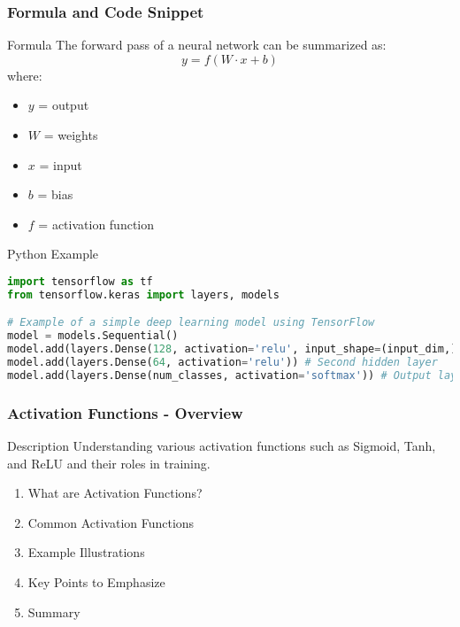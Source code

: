 \documentclass[aspectratio=169]{beamer}
\begin{document}
\begin{frame}[fragile]
    \frametitle{Formula and Code Snippet}
    \begin{block}{Formula}
        The forward pass of a neural network can be summarized as:
        \begin{equation}
            y = f(W \cdot x + b)
        \end{equation}
        where:
        \begin{itemize}
            \item \( y \) = output
            \item \( W \) = weights
            \item \( x \) = input
            \item \( b \) = bias
            \item \( f \) = activation function
        \end{itemize}
    \end{block}
    
    \begin{block}{Python Example}
        \begin{lstlisting}[language=Python]
import tensorflow as tf
from tensorflow.keras import layers, models

# Example of a simple deep learning model using TensorFlow
model = models.Sequential()
model.add(layers.Dense(128, activation='relu', input_shape=(input_dim,))) # First hidden layer
model.add(layers.Dense(64, activation='relu')) # Second hidden layer
model.add(layers.Dense(num_classes, activation='softmax')) # Output layer
        \end{lstlisting}
    \end{block}
\end{frame}

\begin{frame}[fragile]
    \frametitle{Activation Functions - Overview}
    \begin{block}{Description}
        Understanding various activation functions such as Sigmoid, Tanh, and ReLU and their roles in training.
    \end{block}
    
    \begin{enumerate}
        \item What are Activation Functions?
        \item Common Activation Functions
        \item Example Illustrations
        \item Key Points to Emphasize
        \item Summary
    \end{enumerate}
\end{frame}
\end{document}
